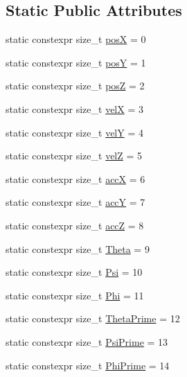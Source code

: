 \subsection*{Static Public Attributes}
\begin{DoxyCompactItemize}
\item 
static constexpr size\+\_\+t \hyperlink{classo_cpt_1_1components_1_1sensors_1_1_state_kalman_i_m_u_a3992946bc78f848a4e76bfa8e9bdbaf6}{posX} = 0
\item 
static constexpr size\+\_\+t \hyperlink{classo_cpt_1_1components_1_1sensors_1_1_state_kalman_i_m_u_a418da0a368af2e931c09211aac2451c2}{posY} = 1
\item 
static constexpr size\+\_\+t \hyperlink{classo_cpt_1_1components_1_1sensors_1_1_state_kalman_i_m_u_a5d55d2f9d87636f0b32cdfd1e9acef0a}{posZ} = 2
\item 
static constexpr size\+\_\+t \hyperlink{classo_cpt_1_1components_1_1sensors_1_1_state_kalman_i_m_u_a7236194c98fe1342621db5e1212a5c9c}{velX} = 3
\item 
static constexpr size\+\_\+t \hyperlink{classo_cpt_1_1components_1_1sensors_1_1_state_kalman_i_m_u_a3a6ea2f74eae7f16a73c539deb0645ee}{velY} = 4
\item 
static constexpr size\+\_\+t \hyperlink{classo_cpt_1_1components_1_1sensors_1_1_state_kalman_i_m_u_af7d5e8203d4a3278463d368dd07817e6}{velZ} = 5
\item 
static constexpr size\+\_\+t \hyperlink{classo_cpt_1_1components_1_1sensors_1_1_state_kalman_i_m_u_a3453cb371171d6753dc93ab75b350c6c}{accX} = 6
\item 
static constexpr size\+\_\+t \hyperlink{classo_cpt_1_1components_1_1sensors_1_1_state_kalman_i_m_u_ab9e11bcdaaf94eab84207043e747bb25}{accY} = 7
\item 
static constexpr size\+\_\+t \hyperlink{classo_cpt_1_1components_1_1sensors_1_1_state_kalman_i_m_u_ab1f138c868f75b567c7edcae5dd43028}{accZ} = 8
\item 
static constexpr size\+\_\+t \hyperlink{classo_cpt_1_1components_1_1sensors_1_1_state_kalman_i_m_u_a9abd5adb833afbc4bc71690326d39161}{Theta} = 9
\item 
static constexpr size\+\_\+t \hyperlink{classo_cpt_1_1components_1_1sensors_1_1_state_kalman_i_m_u_a6534206c4f7f2c52b96a413e74026349}{Psi} = 10
\item 
static constexpr size\+\_\+t \hyperlink{classo_cpt_1_1components_1_1sensors_1_1_state_kalman_i_m_u_af40d1e1e859f609bb91173084ac42483}{Phi} = 11
\item 
static constexpr size\+\_\+t \hyperlink{classo_cpt_1_1components_1_1sensors_1_1_state_kalman_i_m_u_a6b244cd9a4315e36b1872b30d1127810}{Theta\+Prime} = 12
\item 
static constexpr size\+\_\+t \hyperlink{classo_cpt_1_1components_1_1sensors_1_1_state_kalman_i_m_u_ae55de2c7760d25336426afe7512e3825}{Psi\+Prime} = 13
\item 
static constexpr size\+\_\+t \hyperlink{classo_cpt_1_1components_1_1sensors_1_1_state_kalman_i_m_u_ac4bdc3ef893341800a199f0072523d1f}{Phi\+Prime} = 14
\end{DoxyCompactItemize}


